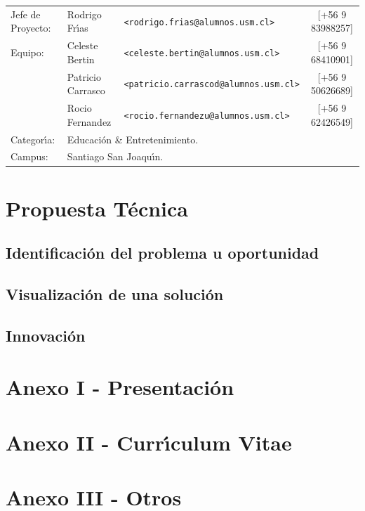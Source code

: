 \documentclass[letterpaper,11pt]{report} %
\numberwithin{equation}{section} %
\numberwithin{figure}{section} %
\numberwithin{table}{section} %
\begin{document}
\begin{titlepage}
\vfill
\begin{flushleft} %
\begin{table}[hb]
  \begin{tabular}{lllc}
    Jefe de Proyecto: & Rodrigo Fr\'{\i}as & \texttt{<rodrigo.frias@alumnos.usm.cl>} & [+56 9 83988257] \\
    Equipo: & Celeste Bertin & \texttt{<celeste.bertin@alumnos.usm.cl>} &[+56 9 68410901]\\
    & Patricio Carrasco &\texttt{<patricio.carrascod@alumnos.usm.cl>} &[+56 9 50626689]\\
    & Rocio Fernandez &\texttt{<rocio.fernandezu@alumnos.usm.cl>} &[+56 9 62426549]\\
    Categor\'{\i}a: & \multicolumn{3}{l}{Educaci\'on \& Entretenimiento.}\\
    Campus: & \multicolumn{3}{l}{Santiago San Joaqu\'{\i}n.}
  \end{tabular}
\end{table}
\end{flushleft}
\end{titlepage}


\setcounter{page}{1} %

\tableofcontents %
\newpage

\chapter{Propuesta T\'ecnica}
\newpage
\section{Identificaci\'on del problema u oportunidad}

\newpage
\section{Visualizaci\'on de una soluci\'on}

\newpage
\section{Innovaci\'on}

\newpage
\chapter{Anexo I - Presentaci\'on} %
\newpage
\chapter{Anexo II - Curr\'{\i}culum Vitae} %




\newpage
\chapter{Anexo III - Otros} %
\end{document}
